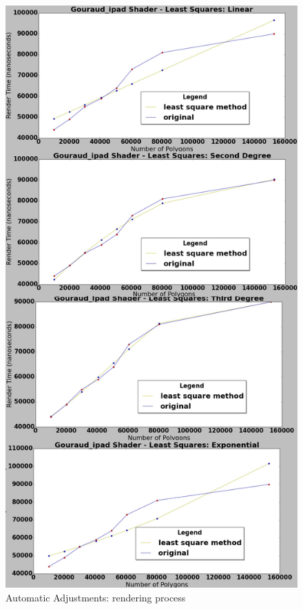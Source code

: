 \documentclass[10pt, conference, compsocconf]{IEEEtran}
\begin{document}
	\begin{figure}[!t]
	\centering
		\includegraphics[keepaspectratio=true,scale=0.23]{ios_minquad_render.jpg}
	\caption{Automatic Adjustments: rendering process}
	\label{tool_result}
	\end{figure}
\end{document}
